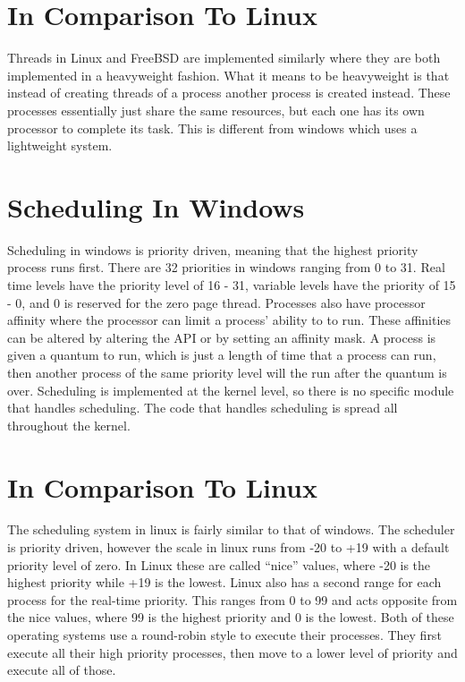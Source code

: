 \documentclass[onecolumn, draftclsnofoot, 10pt, titlepage, compsoc]{IEEEtran}
\begin{document}
\section{In Comparison To Linux}
Threads in Linux and FreeBSD are implemented similarly where they are both implemented in a heavyweight fashion. What it means to be heavyweight is that instead of creating threads of a process another process is created instead. These processes essentially just share the same resources, but each one has its own processor to complete its task. This is different from windows which uses a lightweight system.
\section{Scheduling In Windows}
Scheduling in windows is priority driven, meaning that the highest priority process runs first. There are 32 priorities in windows ranging from 0 to 31. Real time levels have the priority level of 16 - 31, variable levels have the priority of 15 - 0, and 0 is reserved for the zero page thread. Processes also have processor affinity where the processor can limit a process’ ability to to run. These affinities can be altered by altering the API or by setting an affinity mask. A process is given a quantum to run, which is just a length of time that a process can run, then another process of the same priority level will the run after the quantum is over. Scheduling is implemented at the kernel level, so there is no specific module that handles scheduling. The code that handles scheduling is spread all throughout the kernel.
\section{In Comparison To Linux}
The scheduling system in linux is fairly similar to that of windows. The scheduler is priority driven, however the scale in linux runs from -20 to +19 with a default priority level of zero. In Linux these are called “nice” values, where -20 is the highest priority while +19 is the lowest. Linux also has a second range for each process for the real-time priority. This ranges from 0 to 99 and acts opposite from the nice values, where 99 is the highest priority and 0 is the lowest. Both of these operating systems use a round-robin style to execute their processes. They first execute all their high priority processes, then move to a lower level of priority and execute all of those.
\end{document}
